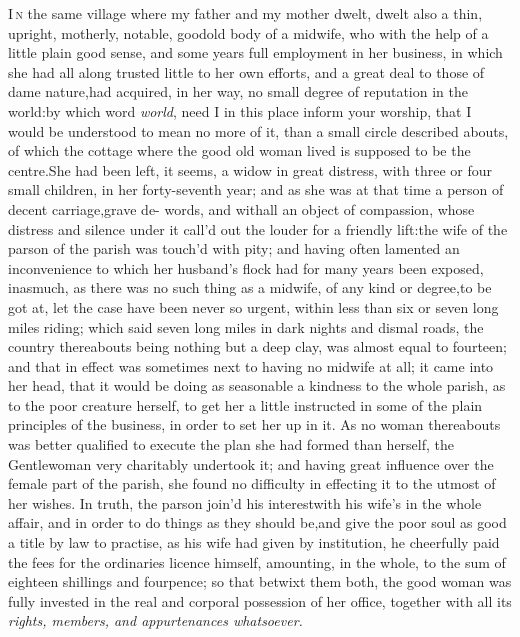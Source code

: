 \documentclass{article}
\begin{document}
\lettrine{I}{\,n} the same village where my father
and my mother dwelt, dwelt also a thin, upright, motherly, notable,
good\break old body of a midwife, who with the help of a little plain
good sense, and some years full employment in her business, in
which she had all along trusted little to her own efforts, and a
great deal to those of dame nature,\tsk  had acquired, in her way,
no small degree of reputation in the world:\tsk  by which word
\textit{world}, need I in this place inform your worship,\pb
that I would be understood to mean no 
more of it, than a small circle described 
abouts, of which the cottage where the good old woman lived is supposed to be
the centre.\tsh  She had been left, it seems, a widow in great distress, with three or
four small children, in her forty-seventh year; and as she was at that time a person
of decent carriage,\tsk  grave de-\break
{}
words, and
withall an object of compassion, whose distress and silence under it call’d out the
louder for a friendly lift:\break the wife of the parson of the parish was touch’d with
pity; and having often la\-mented an inconvenience to which her husband’s flock had
for many years been exposed, inasmuch, as there was no such thing as a midwife, of
any kind or degree,\pb to be got at, let the case have been never so urgent, within
less than six or seven long miles riding; which said seven long miles in dark nights
and dismal roads, the country thereabouts being nothing but a deep clay, was almost
equal to fourteen; and that in effect was sometimes next to having no midwife at
all; it came into her head, that it would be doing as seasonable a kindness to the
whole parish, as to the poor creature herself, to get her a little instructed in
some of the plain principles of the business, in order to set her up in it. As no
woman thereabouts was better qualified to execute the plan she had formed than
herself, the Gentle\-woman very charitably undertook it; and having great influence
over the female part of the parish, she found no difficulty in effecting it to the
utmost of her wishes. In truth, the parson join’d his interest\pb with his wife’s in
the whole affair, and in order to do things as they should be,\break and give the poor
soul as good a title by law to practise, as his wife had given by institution,\tsk
he cheerfully paid the fees for the ordinaries licence himself, amounting, in the
whole, to the sum of eighteen shillings and fourpence; so that betwixt them both,
the good woman was fully invested in the real and corporal possession of her office,
together with all its \textit{rights, members, and appurtenances whatsoever.}
\end{document}

